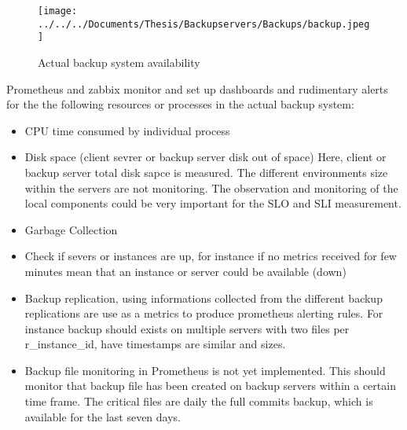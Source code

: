 \documentclass[english]{tktltiki2}
\theoremstyle{definition}
\theoremstyle{remark}
\begin{document}
\begin{figure}[h!]
\texttt{[image: ../../../Documents/Thesis/Backupservers/Backups/backup.jpeg]} 
\caption{Actual backup system availability}
\label{fig:Actual} 
\end{figure}
\pagebreak
Prometheus and zabbix monitor and  set up dashboards and rudimentary alerts for the the following resources or processes in the actual backup system:\\

\begin{itemize}
\item CPU time consumed by individual process
\end{itemize}

\begin{itemize}
\item Disk space (client sevrer or backup server disk out of space)
Here, client or backup server total disk sapce  is measured. The different environments size within the servers are not monitoring. The observation and  monitoring of the local components could be very important for the SLO and SLI measurement.  
\end{itemize}

\begin{itemize}
\item Garbage Collection
\end{itemize}

\begin{itemize}
\item Check if severs or instances are up, for instance if no metrics received for few minutes mean that an instance or server could be available (down)
\end{itemize}

\begin{itemize}
\item Backup replication, using informations collected from the different backup replications are use as a metrics to produce prometheus alerting rules. For instance backup should exists on multiple servers with two files per r\_instance\_id, have timestamps are similar and sizes.
\end{itemize}

\begin{itemize}
\item Backup file monitoring in Prometheus is not yet implemented. This should monitor that backup file has been created on backup servers within a certain time frame.
The critical files are daily the full commits backup,  which is available for the last seven days.
\end{itemize}
\end{document}
